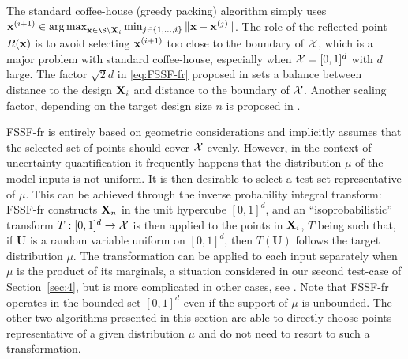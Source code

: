 The standard coffee-house (greedy packing) algorithm simply uses $\bx^{(i+1)} \in \argmax_{\bx \in \S \setminus \bX_i}  \min_{j \in \{1,\ldots,i\}} \|\bx-\bx^{(j)}\|$. The role of the reflected point $R({\bf x})$ is to avoid selecting ${\bf x}^{(i+1)}$ too close to the boundary of $\mathcal{X}$, which is a major problem with standard coffee-house, especially when $\mathcal{X}=[0,1]^d$ with $d$ large. 
The factor $\sqrt{2}d$ in \eqref{eq:FSSF-fr} proposed in \cite{shaapl21} sets a balance between distance to the design ${\bf X}_i$ and distance to the boundary of $\mathcal{X}$. Another scaling factor, depending on the target design  size $n$ is proposed in \cite{NogalesPR2021}.
 
FSSF-fr is entirely based on geometric considerations and implicitly assumes that the selected set of points should cover $\mathcal{X}$ evenly. However, in the context of uncertainty quantification \cite{smi14} it frequently happens that the distribution $\mu$ of the model inputs is not uniform. It is then desirable to select a test set representative of  $\mu$. This can be achieved through the inverse probability integral transform: FSSF-fr constructs ${\bf X}_n$ in the unit hypercube $[0,1]^d$, and an  ``isoprobabilistic'' transform $T:[0,1]^d \rightarrow \mathcal{X}$ is then applied to the points in ${\bf X}_i$, $T$ being such that, if $\boldsymbol{U}$ is a random variable  uniform on $[0,1]^d$, then $T(\boldsymbol{U})$ follows the target distribution $\mu$. The transformation can be applied to each input separately when $\mu$ is the product of its marginals, a situation considered in our second test-case of Section~\ref{sec:4}, but is more complicated in other cases, see \cite[Chap.~4]{lemcha09}. 
Note that FSSF-fr operates in the bounded set $[0,1]^d$ even if the support of $\mu$ is unbounded. 
The other two algorithms presented in this section are able to directly choose points representative of a given distribution $\mu$ and do not need to resort to such a transformation.

